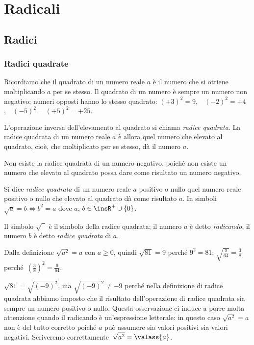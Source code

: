 \chapter{Radicali}
\section{Radici}
\subsection{Radici quadrate}
Ricordiamo che il quadrato di un numero reale $a$ è il numero che si ottiene moltiplicando $a$ per se stesso. Il quadrato di un numero è sempre un numero non negativo; numeri opposti hanno lo stesso quadrato: $(+3)^2=9$,~~$(-2)^2=+4$,~~$(-5)^2=(+5)^2=+25$.

L'operazione inversa dell'elevamento al quadrato si chiama \emph{radice quadrata}. La radice quadrata di un numero reale $a$ è allora quel numero che elevato al quadrato, cioè, che moltiplicato per se stesso, dà il numero $a$.

\osservazione Non esiste la radice quadrata di un numero negativo, poiché non esiste un numero che elevato al quadrato possa dare come risultato un numero negativo.

\begin{definizione}
Si dice \emph{radice quadrata} di un numero reale $a$ positivo o nullo quel numero reale positivo o nullo che elevato al quadrato dà come risultato $a$.
In simboli~$\sqrt{a}=b \Leftrightarrow b^2=a$ dove $a$, $b\in \insR^{+}\cup \{0\}$.
\end{definizione}

Il simbolo $\sqrt{\phantom{5}}$ è il simbolo della radice quadrata; il numero $a$ è detto \emph{radicando}, il numero $b$ è detto \emph{radice quadrata} di $a$.

Dalla definizione $\sqrt{a^2}=a$ con $a\ge 0$, quindi $\sqrt{81}=9$ perché $9^2=81$; $\sqrt{\frac{9}{64}}=\frac{3}{8}$ perché~$\left(\frac{3}{8}\right)^2=\frac{9}{64}$.

\osservazione $\sqrt{81}=\sqrt{(-9)^2}$, ma $\sqrt{(-9)^2}\neq-9$ perché nella definizione di radice quadrata abbiamo imposto che il risultato dell'operazione di radice quadrata sia sempre un numero positivo o nullo.
Questa osservazione ci induce a porre molta attenzione quando il radicando è un'espressione letterale: in questo caso $\sqrt{a^2}=a$ non è del tutto corretto poiché $a$ può assumere sia valori positivi sia valori negativi. Scriveremo correttamente~$\sqrt{a^2}=\valass{a}$.

